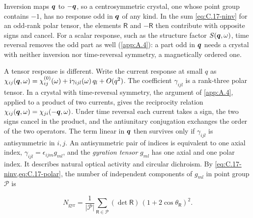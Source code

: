 Inversion maps $\bm{q}$ to $-\bm{q}$, so a centrosymmetric crystal, one whose point group contains $-1$, has no response odd in $\bm{q}$ of any kind. In the sum \cref{eq:C.17-ninv} for an odd-rank polar tensor, the elements $\mathsf{R}$ and $-\mathsf{R}$ then contribute with opposite signs and cancel. For a scalar response, such as the structure factor $S(\bm{q},\omega)$, time reversal removes the odd part as well (\cref{app:A.4}): a part odd in $\bm{q}$ needs a crystal with neither inversion nor time-reversal symmetry, a magnetically ordered one.

A tensor response is different. Write the current response at small $q$ as $\chi_{ij}(\bm{q},\omega) = \chi_{ij}^{(0)}(\omega) + \mathrm{i}\gamma_{ijl}(\omega)\,q_l + O(q^2)$. The coefficient $\gamma_{ijl}$ is a rank-three polar tensor. In a crystal with time-reversal symmetry, the argument of \cref{app:A.4}, applied to a product of two currents, gives the reciprocity relation $\chi_{ij}(\bm{q},\omega) = \chi_{ji}(-\bm{q},\omega)$. Under time reversal each current takes a sign, the two signs cancel in the product, and the antiunitary conjugation exchanges the order of the two operators. The term linear in $\bm{q}$ then survives only if $\gamma_{ijl}$ is antisymmetric in $i, j$. An antisymmetric pair of indices is equivalent to one axial index, $\gamma_{ijl} = \epsilon_{ijm}g_{ml}$, and the \emph{gyration tensor} $g_{ml}$ has one axial and one polar index. It describes natural optical activity and circular dichroism. By \cref{eq:C.17-ninv,eq:C.17-polar}, the number of independent components of $g_{ml}$ in point group $\mathcal{P}$ is
\begin{keyresult}
\begin{equation}
  N_{\mathrm{gyr}} = \frac{1}{|\mathcal{P}|}\sum_{\mathsf{R}\in\mathcal{P}}(\det\mathsf{R})\,(1 + 2\cos\theta_{\mathsf{R}})^2 .
  \label{eq:C.17-gyration}
\end{equation}
\end{keyresult}

